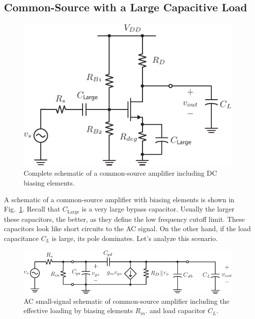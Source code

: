 \subsection{Common-Source with a Large Capacitive Load}
\begin{figure}[tb]
\centering
\includegraphics[scale=1]{6cs_dc}
\caption{Complete schematic of a common-source amplifier including DC biasing elements.}
\label{fig:6cs_dc}
\end{figure}
A schematic of a common-source amplifier with biasing elements is shown in Fig.~\ref{fig:6cs_dc}. Recall that $C_{\text{Large}}$ is a very large bypass capacitor.  Usually the larger these capacitors, the better, as they define the low frequency cutoff limit.  These capacitors look like short circuits to the AC signal.  On the other hand, if the load capacitance $C_L$ is large, its pole dominates. Let's analyze this scenario.
\begin{figure}[tb]
\centering
\includegraphics[scale=1]{7cs_cL_ss}
\caption{AC small-signal schematic of common-source amplifier including the effective loading by biasing elements $R_{in}$. and load capacitor $C_L$.}
\label{fig:7cs_cL_ss}
\end{figure}

